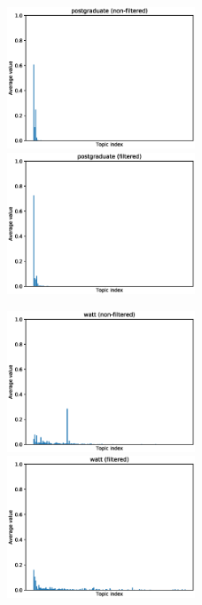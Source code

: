 \begin{figure}[ht]
    \centering
    \includegraphics[width=0.5\textwidth]{images/similarity_graphs/non-filtered/postgraduate.eps}%
    \hfill
    \includegraphics[width=0.5\textwidth]{images/similarity_graphs/filtered/postgraduate.eps}
\end{figure}

\pagebreak
\begin{figure}[ht]
    \centering
    \includegraphics[width=0.5\textwidth]{images/similarity_graphs/non-filtered/watt.eps}%
    \hfill
    \includegraphics[width=0.5\textwidth]{images/similarity_graphs/filtered/watt.eps}
\end{figure}